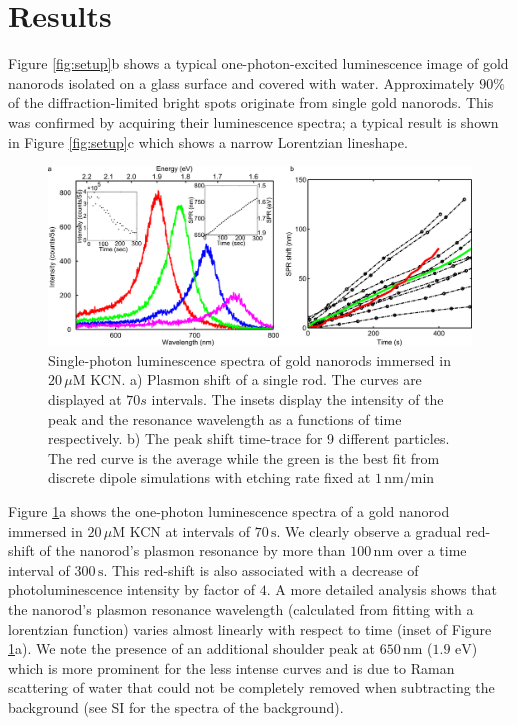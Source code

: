 \documentclass[a4paper,oneside,onecolumn]{article}
\newcommand{\nm}{\ensuremath{\,\textrm{nm}}}
\newcommand{\eV}{\ensuremath{\,\textrm{eV}}}
\newcommand{\uM}{\ensuremath{\,\mu\textrm{M}}}
\begin{document}
\section{Results}

Figure \ref{fig:setup}b shows a typical one-photon-excited luminescence image
of gold nanorods isolated on a glass surface and covered with water.
Approximately $90\%$ of the diffraction-limited bright spots originate from
single gold nanorods. This was confirmed by acquiring their luminescence
spectra; a typical result is shown in Figure \ref{fig:setup}c which shows
a narrow Lorentzian lineshape\cite{Funston2009}.

\begin{figure}[p]
 \centering 
 \includegraphics[width=0.95\linewidth]{Figures/02_Experimental/Experimental.png}
 \caption{Single-photon luminescence spectra of gold nanorods immersed in $20\uM$ KCN. a) Plasmon shift of a single rod. The curves are displayed at $70s$
 intervals. The insets display the intensity of the peak and the resonance
 wavelength as a functions of time respectively. b) The peak shift time-trace
 for 9 different particles. The red curve is the average while the green is
 the best fit from discrete dipole simulations with etching rate fixed at
 $1\nm/\textrm{min}$}
 \label{fig:plasmon_single_rod}
\end{figure}

Figure \ref{fig:plasmon_single_rod}a shows the one-photon luminescence spectra
of a gold nanorod immersed in $20\uM$ KCN at intervals of $70\,\text{s}$. We
clearly observe a gradual red-shift of the nanorod's plasmon resonance by more
than  $100\nm$ over a time interval of $300\,\text{s}$. This red-shift is also
associated with a decrease of photoluminescence intensity by factor of $4$. A
more detailed analysis shows that the nanorod's plasmon resonance wavelength
(calculated from fitting with a lorentzian function) varies almost linearly
with respect to time (inset of Figure \ref{fig:plasmon_single_rod}a). We note
the presence of an additional shoulder peak at $650\nm$ ($1.9\,\eV$) which is
more prominent for the less intense curves and is due to Raman scattering of
water\cite{Snow1985} that could not be completely removed when subtracting the
background (see SI for the spectra of the background).
\end{document}
